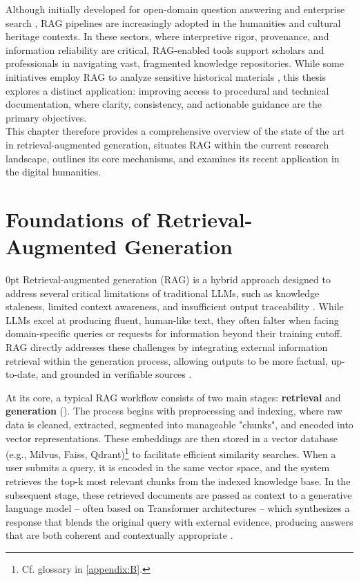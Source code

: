 \begin{spacing}{1.5}
Although initially developed for open-domain question answering and enterprise search \parencite{akkiraju_facts_2024, jiang_towards_2024, packowski_optimizing_2024, yang_ragva_2025, zhou_enabling_2025}, RAG pipelines are increasingly adopted in the humanities and cultural heritage contexts. In these sectors, where interpretive rigor, provenance, and information reliability are critical, RAG-enabled tools support scholars and professionals in navigating vast, fragmented knowledge repositories. While some initiatives employ RAG to analyze sensitive historical materials \citep{callaghan_prototyping_2025, ciletti_retrieval-augmented_2025, sergeev_talking_2025, fan_research_2025}, this thesis explores a distinct application: improving access to procedural and technical documentation, where clarity, consistency, and actionable guidance are the primary objectives.
\\

This chapter therefore provides a comprehensive overview of the state of the art in retrieval-augmented generation, situates RAG within the current research landscape, outlines its core mechanisms, and examines its recent application in the digital humanities.

\section{Foundations of Retrieval-Augmented Generation}\setlength{\parskip}
{0pt}
Retrieval-augmented generation (RAG) is a hybrid approach designed to address several critical limitations of traditional LLMs, such as knowledge staleness, limited context awareness, and insufficient output traceability \parencite{vaibhav_retrieval-augmented_2025,gao_retrieval-augmented_2024, gupta_comprehensive_2024}. While LLMs excel at producing fluent, human-like text, they often falter when facing domain-specific queries or requests for information beyond their training cutoff. RAG directly addresses these challenges by integrating external information retrieval within the generation process, allowing outputs to be more factual, up-to-date, and grounded in verifiable sources \citep{wang_searching_2024}.

At its core, a typical RAG workflow consists of two main stages: \textbf{retrieval} and \textbf{generation} (\cite{odsc-community_retrieval-augmented_2024}). The process begins with preprocessing and indexing, where raw data is cleaned, extracted, segmented into manageable "chunks", and encoded into vector representations. These embeddings are then stored in a vector database (e.g., Milvus, Faiss, Qdrant)\footnote{Cf. glossary in \autoref{appendix:B}.} to facilitate efficient similarity searches. When a user submits a query, it is encoded in the same vector space, and the system retrieves the top-k most relevant chunks from the indexed knowledge base. In the subsequent stage, these retrieved documents are passed as context to a generative language model -- often based on Transformer architectures \citep{vaswani_attention_2017} -- which synthesizes a response that blends the original query with external evidence, producing answers that are both coherent and contextually appropriate \citep{arslan_survey_2024}.


\end{spacing}
